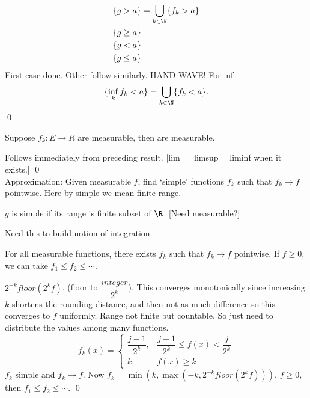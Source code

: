 	\[
	\begin{split}
	\{g>a\}&= \bigcup_{k \in \N} \{f_k>a\} \\
	\{g \geq a\}& \\
	\{g<a\}& \\
	\{g \leq a\}& \\
	\end{split}
	\]
First case done. Other follow similarly. HAND WAVE! For inf
	\[
	\{ \inf_k f_k<a\}= \bigcup_{k \in \N} \{f_k<a\}.
	\]
\qed \\





\begin{thm}
Suppose $f_k: E \to \overline{R}$ are measurable, then
are measurable. 
\end{thm}

\pf Follows immediately from preceding result. [lim$=$ limsup$=$liminf when it exists.] \qed \\









Approximation: Given measurable $f$, find `simple' functions $f_k$ such that $f_k \to f$ pointwise. Here by simple we mean finite range. 

\begin{dfn}[Simple]
$g$ is simple if its range is finite subset of $\R$. [Need measurable?]
\end{dfn}


Need this to build notion of integration. 

\begin{thm}
For all measurable functions, there exists $f_k$ such that $f_k \to f$ pointwise. If $f \geq 0$, we can take $f_1 \leq f_2 \leq \cdots$.
\end{thm}

\pf $2^{-k} floor(2^k f)$. (floor to $\dfrac{integer}{2^k}$). This converges monotonically since increasing $k$ shortens the rounding distance, and then not as much difference so this converges to $f$ uniformly. Range not finite but countable. So just need to distribute the values among many functions. 
	\[
	f_k(x)=
	\begin{cases}
	\dfrac{j-1}{2^k}, & \dfrac{j-1}{2^k} \leq f(x) < \dfrac{j}{2^k} \\
	k, & f(x) \geq k
	\end{cases}
	\]
$f_k$ simple and $f_k \to f$. Now $f_k= \min(k,\max(-k,2^{-k}floor(2^kf)))$. $f \geq 0$, then $f_1 \leq f_2 \leq \cdots$. 
\qed \\



